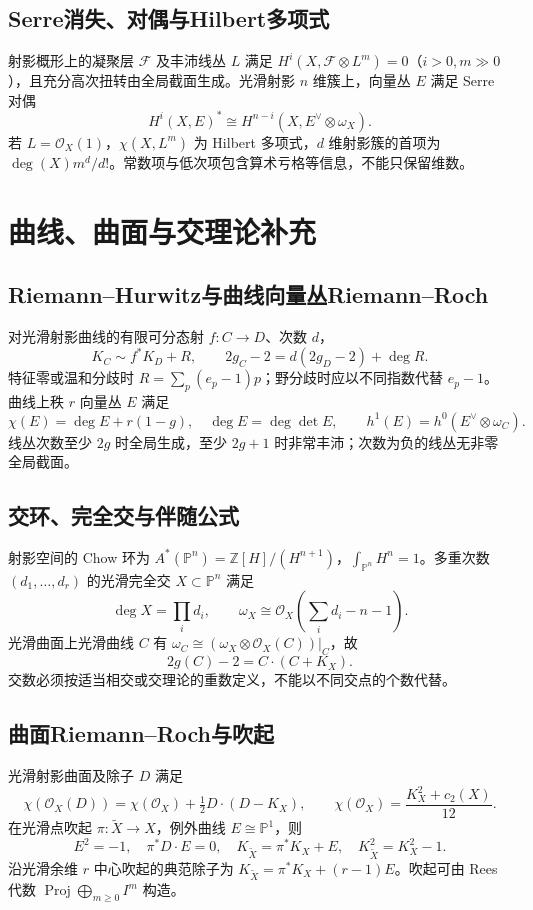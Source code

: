 \documentclass[../main.tex]{subfiles}
\begin{document}
\subsection{Serre消失、对偶与Hilbert多项式}
射影概形上的凝聚层 $\mathcal F$ 及丰沛线丛 $L$ 满足 $H^i(X,\mathcal F\otimes L^m)=0$（$i>0,m\gg0$），且充分高次扭转由全局截面生成。光滑射影 $n$ 维簇上，向量丛 $E$ 满足 Serre 对偶
\[
H^i(X,E)^*\cong H^{n-i}(X,E^\vee\otimes\omega_X).
\]
若 $L=\mathcal O_X(1)$，$\chi(X,L^m)$ 为 Hilbert 多项式，$d$ 维射影簇的首项为 $\deg(X)m^d/d!$。常数项与低次项包含算术亏格等信息，不能只保留维数。
\section{曲线、曲面与交理论补充}
\subsection{Riemann--Hurwitz与曲线向量丛Riemann--Roch}
对光滑射影曲线的有限可分态射 $f:C\to D$、次数 $d$，
\[
K_C\sim f^*K_D+R,\qquad 2g_C-2=d(2g_D-2)+\deg R.
\]
特征零或温和分歧时 $R=\sum_p(e_p-1)p$；野分歧时应以不同指数代替 $e_p-1$。曲线上秩 $r$ 向量丛 $E$ 满足
\[
\chi(E)=\deg E+r(1-g),\quad\deg E=\deg\det E,\qquad
h^1(E)=h^0(E^\vee\otimes\omega_C).
\]
线丛次数至少 $2g$ 时全局生成，至少 $2g+1$ 时非常丰沛；次数为负的线丛无非零全局截面。
\subsection{交环、完全交与伴随公式}
射影空间的 Chow 环为 $A^*(\mathbb P^n)=\mathbb Z[H]/(H^{n+1})$，$\int_{\mathbb P^n}H^n=1$。多重次数 $(d_1,\ldots,d_r)$ 的光滑完全交 $X\subset\mathbb P^n$ 满足
\[
\deg X=\prod_i d_i,\qquad
\omega_X\cong\mathcal O_X\left(\sum_i d_i-n-1\right).
\]
光滑曲面上光滑曲线 $C$ 有 $\omega_C\cong(\omega_X\otimes\mathcal O_X(C))|_C$，故
\[
2g(C)-2=C\cdot(C+K_X).
\]
交数必须按适当相交或交理论的重数定义，不能以不同交点的个数代替。
\subsection{曲面Riemann--Roch与吹起}
光滑射影曲面及除子 $D$ 满足
\[
\chi(\mathcal O_X(D))=\chi(\mathcal O_X)+\tfrac12D\cdot(D-K_X),\qquad
\chi(\mathcal O_X)=\frac{K_X^2+c_2(X)}{12}.
\]
在光滑点吹起 $\pi:\widetilde X\to X$，例外曲线 $E\cong\mathbb P^1$，则
\[
E^2=-1,\quad\pi^*D\cdot E=0,\quad
K_{\widetilde X}=\pi^*K_X+E,\quad K_{\widetilde X}^2=K_X^2-1.
\]
沿光滑余维 $r$ 中心吹起的典范除子为 $K_{\widetilde X}=\pi^*K_X+(r-1)E$。吹起可由 Rees 代数 $\operatorname{Proj}\bigoplus_{m\ge0}I^m$ 构造。
\end{document}
